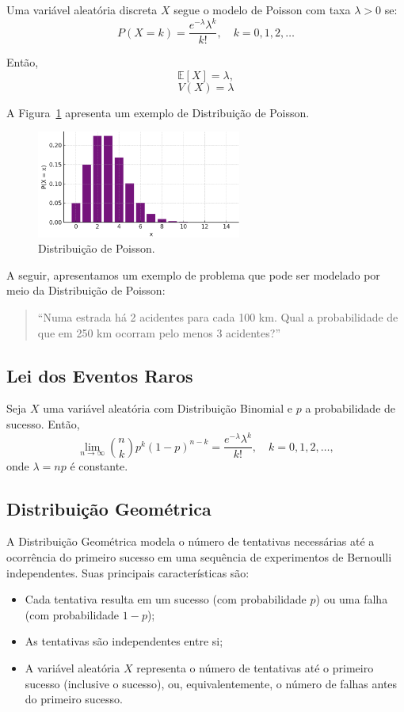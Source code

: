 \documentclass{article}
\begin{document}
Uma variável aleatória discreta $X$ segue o modelo de Poisson com taxa $\lambda > 0$ se:
    $$
    P(X = k) = \frac{e^{-\lambda} \lambda^k}{k!}, \quad k = 0, 1, 2, \ldots
    $$

Então,
    $$
    \mathbb{E}[X] = \lambda,
    $$
    $$
    V(X) = \lambda
    $$

A Figura~\ref{fig:dist_disc_poisson} apresenta um exemplo de Distribuição de Poisson.

\begin{figure}[H]
    \centering
    \includegraphics[width=0.6\textwidth]{figuras/dist_disc_poisson.png}
    \caption{Distribuição de Poisson.}
    \label{fig:dist_disc_poisson}
\end{figure}

A seguir, apresentamos um exemplo de problema que pode ser modelado por meio da Distribuição de Poisson:
\begin{quote}
``Numa estrada há 2 acidentes para cada 100 km. Qual a probabilidade de que em 250 km ocorram pelo menos 3 acidentes?''
\end{quote}

\subsection{Lei dos Eventos Raros}
Seja $X$ uma variável aleatória com Distribuição Binomial e $p$ a probabilidade de sucesso. Então,
    $$
    \lim_{n \to \infty} \binom{n}{k} p^k (1 - p)^{n - k} = \frac{e^{-\lambda} \lambda^k}{k!}, \quad k = 0, 1, 2, \ldots,
    $$
onde $\lambda = np$ é constante.

\subsection{Distribuição Geométrica}
A Distribuição Geométrica modela o número de tentativas necessárias até a ocorrência do primeiro sucesso em uma sequência de experimentos de Bernoulli independentes. Suas principais características são:

\begin{itemize}
    \item Cada tentativa resulta em um sucesso (com probabilidade $p$) ou uma falha (com probabilidade $1 - p$);
    \item As tentativas são independentes entre si;
    \item A variável aleatória $X$ representa o número de tentativas até o primeiro sucesso (inclusive o sucesso), ou, equivalentemente, o número de falhas antes do primeiro sucesso.
\end{itemize}
\end{document}
